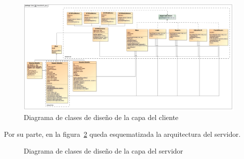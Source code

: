 \begin{landscape}
	\begin{figure}
		\centering
		\includegraphics[width=\linewidth,height=\textheight,keepaspectratio]{Images/Diagramas/05_ClasesDiseno_App}
		\caption{Diagrama de clases de diseño de la capa del cliente}
		\label{fig:diagramaClasesDisenoCliente}
	\end{figure}	
\end{landscape}

Por su parte, en la figura~\ref{fig:diagramaClasesDisenoServidor} queda esquematizada la arquitectura del servidor.

\begin{figure} [!htb]
	\centering
	\caption{Diagrama de clases de diseño de la capa del servidor}
	\label{fig:diagramaClasesDisenoServidor}
\end{figure}

